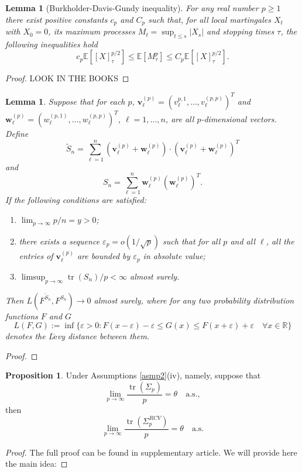 \documentclass[a4paper,11pt]{article}
\theoremstyle{plain}
\newtheorem{lmm}[thm]{Lemma}
\theoremstyle{definition}
\newtheorem{prps}[thm]{Proposition}
\newcommand{\ME}{\mathbb{E}}
\newcommand{\MR}{\mathbb{R}}
\newcommand{\tr}{\operatorname{tr}}
\begin{document}
    \begin{lmm}[Burkholder-Davis-Gundy inequality] \label{BDG}
    	For any real number $p \geq 1$ there exist positive constants $c_p$ and $C_p$ such that, for all local martingales $X_t$ with $X_0 = 0$, its maximum processes $M_t = \sup_{t \leq s} |X_s|$ and stopping times $\tau$, the following inequalities hold
    	\[ c_p \ME[[X]_\tau^{p/2}] \leq \ME[M_\tau^p] \leq C_p \ME[[X]_\tau^{p/2}]. \]
    \end{lmm}
    \begin{proof}
    	LOOK IN THE BOOKS
    \end{proof}
    
    \begin{lmm} \label{lmm1}
    	Suppose that for each $p$, $\mathbf{v}_\ell^{(p)} = (v_\ell^{p, 1}, \dots, v_\ell^{(p, p)})^T$ and $\mathbf{w}_\ell^{(p)} = (w_\ell^{(p, 1)}, \dots, w_\ell^{(p, p)})^T$, $\ell = 1, \dots, n$, are all $p$-dimensional vectors. Define
    	\[	\widetilde{S}_n = \sum_{\ell = 1}^{n} (\mathbf{v}_\ell^{(p)} + \mathbf{w}_\ell^{(p)}) \cdot (\mathbf{v}_\ell^{(p)} + \mathbf{w}_\ell^{(p)})^T\]
    	and
    	\[S_n = \sum_{\ell = 1}^{n} \mathbf{w}_\ell^{(p)} (\mathbf{w}_\ell^{(p)})^T. \]
    	If the following conditions are satisfied:
    	\begin{enumerate}
    		\item $\lim_{p \rightarrow \infty} p/n = y > 0$;
    		\item there exists a sequence $\varepsilon_p = o(1/\sqrt{p})$ such that for all $p$ and all $\ell$, all the entries of $\mathbf{v}_\ell^{(p)}$ are bounded by $\varepsilon_p$ in absolute value;
    		\item $ \limsup_{p \rightarrow \infty} {\tr(S_n)}/{p} < \infty$ almost surely.
    	\end{enumerate}
    	Then $L(F^{\widetilde{S}_n}, F^{S_n}) \rightarrow 0$ almost surely, where for any two probability distribution functions $F$ and $G$
    	\[ L(F, G) := \inf \{ \varepsilon > 0 : F(x-\varepsilon) -\varepsilon \leq G(x) \leq F(x+\varepsilon) + \varepsilon \quad \forall x\in\MR   \} \]
    	denotes the L$\acute{\text{e}}$vy distance between them.
    \end{lmm}
    \begin{proof}
    	
    \end{proof}
    
    \begin{prps}
    	Under Assumptions \ref{asmp2}(iv), namely, suppose that
    	\[ \lim_{p \rightarrow \infty} \frac{\tr(\Sigma_p)}{p} = \theta \quad \text{a.s.}, \]
    	then
    	\[ \lim_{p \rightarrow \infty} \frac{\tr(\Sigma_p^{RCV})}{p} = \theta \quad \text{a.s.} \]
    \end{prps}
    \begin{proof}
    	The full proof can be found in supplementary article. We will provide here the main idea:
    \end{proof}
    
\end{document}
